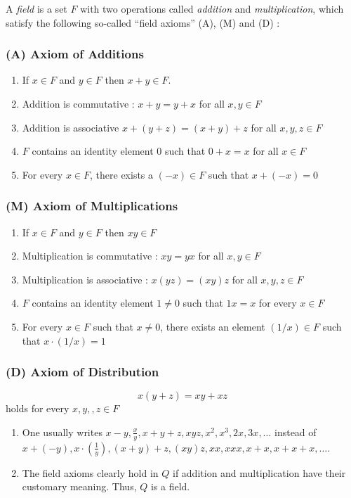 \begin{defn}
	A {\it field} is a set $F$ with two operations called {\it addition} and {\it multiplication},
	which satisfy the following so-called ``field axioms'' (A), (M) and (D) :
	\subsubsection{(A) Axiom of Additions}
	\label{add}
	\begin{enumerate}[(\text{A}1)]
		\item If $x \in F$ and $y \in F$ then $x + y \in F$.
		\item Addition is commutative : $x + y = y + x$ for all $x, y \in F$
		\item Addition is associative $x + (y + z) = (x + y) + z$ for all $x, y, z \in F$
		\item $F$ contains an identity element $0$ such that $0 + x = x$ for all $x \in F$
		\item For every $x \in F$, there exists a $(-x) \in F$ such that $x + (-x) = 0$
	\end{enumerate}

	\subsubsection{(M) Axiom of Multiplications}
	\label{mul}
	\begin{enumerate}[(M1)]
		\item If $x \in F$ and $y \in F$ then $xy \in F$
		\item Multiplication is commutative : $xy = yx$ for all $x, y \in F$
		\item Multiplication is associative : $x(yz) = (xy)z$ for all $x, y, z \in F$
		\item $F$ contains an identity element $1 \neq 0$ such that $1x = x$ for every $x \in F$
		\item For every $x \in F$ such that $x \neq 0$, there exists an element $(1/x) \in F$
		such that $x \cdot (1/x) = 1$
	\end{enumerate}

	\subsubsection{(D) Axiom of Distribution}
	\label{dis}
	$$ x (y + z) = xy + xz $$ holds for every $x, y,, z \in F$
\end{defn}

\begin{rem}
	\begin{enumerate}
		\item One usually writes $ x - y, \frac{x}{y}, x + y + z, xyz, x^2, x^3, 2x, 3x, \dots $ instead of
		$ x + (-y), x \cdot \left( \frac{1}{y} \right), (x+y)+z, (xy)z, xx, xxx, x+x, x+x+x, \dots $.
		\item The field axioms clearly hold in $Q$ if addition and multiplication have their customary meaning.
		Thus, $Q$ is a field.

	\end{enumerate}

\end{rem}

